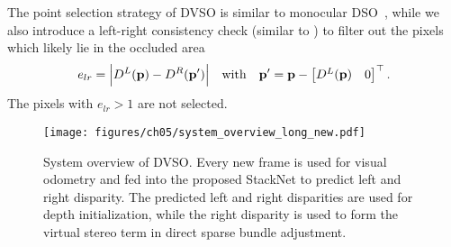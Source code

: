 \documentclass[runningheads]{llncs}
\begin{document}
The point selection strategy of DVSO is similar to 
monocular DSO~\cite{engel2017direct}, while we also introduce a left-right 
consistency check (similar to ) to filter out the 
pixels which likely lie in the occluded area
\begin{equation}
	e_{lr} = \Bigl | D^{L}(\mathbf{p}) - 
	D^{R}(\mathbf{p'}) \Bigr | \quad \text{with} \quad \mathbf{p'} = \mathbf{p} 
	- 
	\begin{bmatrix}
	D^L(\mathbf{p}) & 0\\
	\end{bmatrix}^\top.
\end{equation}
The pixels with $e_{lr} > 1$ are not selected. 

\begin{figure}[tb]
	\centering
	\texttt{[image: figures/ch05/system\_overview\_long\_new.pdf]}
	\caption{System overview of 
	DVSO. Every new frame is used for visual odometry and fed into 
		the proposed StackNet to predict left and right disparity. The predicted left and right disparities are used for 
		depth initialization, while the right disparity is used to form the virtual stereo term in direct sparse bundle adjustment.}
	\label{fig:sys_overview}
\end{figure}
\end{document}
